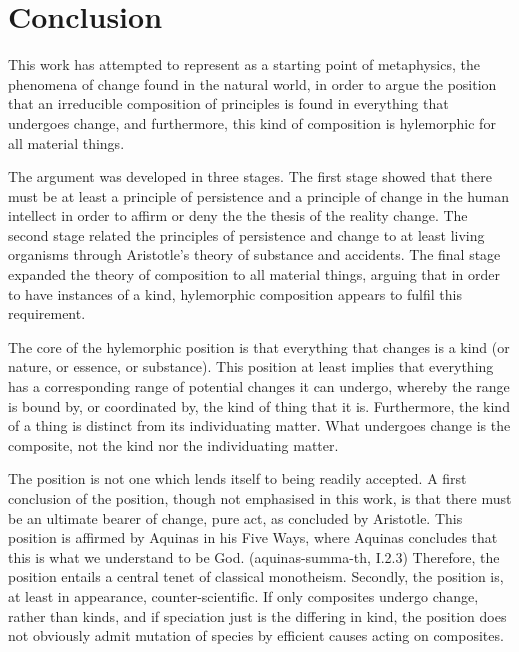 \chapter{Conclusion}
\label{ch:conclusion}

This work has attempted to represent as a starting point of metaphysics, the phenomena of change found in the natural world, in order to argue the position that an irreducible composition of principles is found in everything that undergoes change, and furthermore, this kind of composition is hylemorphic for all material things.

The argument was developed in three stages. The first stage showed that there must be at least a principle of persistence and a principle of change in the human intellect in order to affirm or deny the the thesis of the reality change. The second stage related the principles of persistence and change to at least living organisms through Aristotle's theory of substance and accidents. The final stage expanded the theory of composition to all material things, arguing that in order to have instances of a kind, hylemorphic composition appears to fulfil this requirement.

The core of the hylemorphic position is that everything that changes is a kind (or nature, or essence, or substance). This position at least implies that everything has a corresponding range of potential changes it can undergo, whereby the range is bound by, or coordinated by, the kind of thing that it is. Furthermore, the kind of a thing is distinct from its individuating matter. What undergoes change is the composite, not the kind nor the individuating matter.

The position is not one which lends itself to being readily accepted. A first conclusion of the position, though not emphasised in this work, is that there must be an ultimate bearer of change, pure act, as concluded by Aristotle. This position is affirmed by Aquinas in his Five Ways, where Aquinas concludes that this is what we understand to be God. (\acrshort{aquinas-summa-th}, I.2.3) Therefore, the position entails a central tenet of classical monotheism. Secondly, the position is, at least in appearance, counter-scientific.
If only composites undergo change, rather than kinds, and if speciation just is the differing in kind, the position does not obviously admit mutation of species by efficient causes acting on composites.

